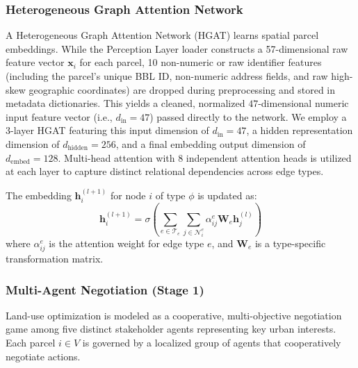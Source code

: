 \documentclass[final,3p,times]{elsarticle}
\begin{document}
\subsubsection{Heterogeneous Graph Attention Network}
A Heterogeneous Graph Attention Network (HGAT) learns spatial parcel embeddings. While the Perception Layer loader constructs a 57-dimensional raw feature vector $\mathbf{x}_i$ for each parcel, 10 non-numeric or raw identifier features (including the parcel's unique BBL ID, non-numeric address fields, and raw high-skew geographic coordinates) are dropped during preprocessing and stored in metadata dictionaries. This yields a cleaned, normalized $47$-dimensional numeric input feature vector (i.e., $d_{\text{in}} = 47$) passed directly to the network. We employ a 3-layer HGAT featuring this input dimension of $d_{\text{in}} = 47$, a hidden representation dimension of $d_{\text{hidden}} = 256$, and a final embedding output dimension of $d_{\text{embed}} = 128$. Multi-head attention with 8 independent attention heads is utilized at each layer to capture distinct relational dependencies across edge types.

The embedding $\mathbf{h}_i^{(l+1)}$ for node $i$ of type $\phi$ is updated as:
\begin{equation}
\mathbf{h}_i^{(l+1)} = \sigma \left( \sum_{e \in \mathcal{T}_e} \sum_{j \in \mathcal{N}_i^e} \alpha_{ij}^e \mathbf{W}_e \mathbf{h}_j^{(l)} \right)
\end{equation}
where $\alpha_{ij}^e$ is the attention weight for edge type $e$, and $\mathbf{W}_e$ is a type-specific transformation matrix.

\subsubsection{Multi-Agent Negotiation (Stage 1)}
Land-use optimization is modeled as a cooperative, multi-objective negotiation game among five distinct stakeholder agents representing key urban interests. Each parcel $i \in V$ is governed by a localized group of agents that cooperatively negotiate actions. 
\end{document}
